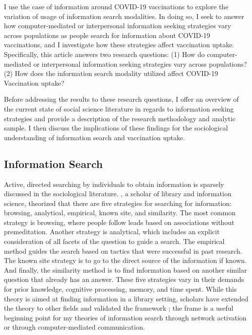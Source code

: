 I use the case of information around COVID-19 vaccinations to explore the
variation of usage of information search modalities. In doing so, I seek to
answer how computer-mediated or interpersonal information seeking strategies
vary across populations as people search for information about COVID-19
vaccinations, and I investigate how these strategies affect vaccination uptake.
Specifically, this article answers two research questions: (1) How do
computer-mediated or interpersonal information seeking strategies vary across
populations? (2) How does the information search modality utilized affect
COVID-19 Vaccination uptake?

Before addressing the results to these research questions, I offer an overview
of the current state of social science literature in regards to information
seeking strategies and provide a description of the research methodology and
analytic sample. I then discuss the implications of these findings for the
sociological understanding of information search and vaccination uptake.

\hypertarget{information-search}{\subsection{Information Search}\label{information-search}}

Active, directed searching by individuals to obtain information is sparsely
discussed in the sociological literature.
\citet{pejtersenDesignComputeraidedUsersystem1984}, a scholar of library and
information science, theorized that there are five strategies for searching for
information: browsing, analytical, empirical, known site, and similarity. The
most common strategy is browsing, where people follow leads based on
associations without premeditation. Another strategy is analytical, which
includes an explicit consideration of all facets of the question to guide a
search. The empirical method guides the search based on tactics that were
successful in past research. The known site strategy is to go to the direct
source of the information if known. And finally, the similarity method is to
find information based on another similar question that already has an answer.
These five strategies vary in their demands for prior knowledge, cognitive
processing, memory, and time spent. While this theory is aimed at finding
information in a library setting, scholars have extended the theory to other
fields and validated the framework \citep{fidelHumanInformationInteraction2012};
the frame is a useful beginning point for my theories of information search
through network activation or through computer-mediated communication.

